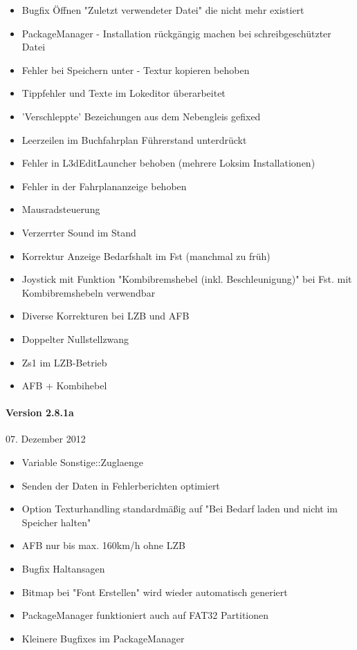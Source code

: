 \begin{itemize}
\itemsep1pt\parskip0pt
\item
  Bugfix Öffnen "Zuletzt verwendeter Datei" die nicht mehr existiert
\item
  PackageManager - Installation rückgängig machen bei schreibgeschützter
  Datei
\item
  Fehler bei Speichern unter - Textur kopieren behoben
\item
  Tippfehler und Texte im Lokeditor überarbeitet
\item
  'Verschleppte' Bezeichungen aus dem Nebengleis gefixed
\item
  Leerzeilen im Buchfahrplan Führerstand unterdrückt
\item
  Fehler in L3dEditLauncher behoben (mehrere Loksim Installationen)
\item
  Fehler in der Fahrplananzeige behoben
\item
  Mausradsteuerung
\item
  Verzerrter Sound im Stand
\item
  Korrektur Anzeige Bedarfshalt im Fst (manchmal zu früh)
\item
  Joystick mit Funktion "Kombibremshebel (inkl. Beschleunigung)" bei
  Fst. mit Kombibremshebeln verwendbar
\item
  Diverse Korrekturen bei LZB und AFB
\item
  Doppelter Nullstellzwang
\item
  Zs1 im LZB-Betrieb
\item
  AFB + Kombihebel
\end{itemize}

\paragraph{Version 2.8.1a}

07. Dezember 2012

\begin{itemize}
\itemsep1pt\parskip0pt
\item
  Variable Sonstige::Zuglaenge
\item
  Senden der Daten in Fehlerberichten optimiert
\item
  Option Texturhandling standardmäßig auf "Bei Bedarf laden und nicht im
  Speicher halten"
\end{itemize}

\begin{itemize}
\itemsep1pt\parskip0pt
\item
  AFB nur bis max. 160km/h ohne LZB
\item
  Bugfix Haltansagen
\item
  Bitmap bei "Font Erstellen" wird wieder automatisch generiert
\item
  PackageManager funktioniert auch auf FAT32 Partitionen
\item
  Kleinere Bugfixes im PackageManager
\end{itemize}

